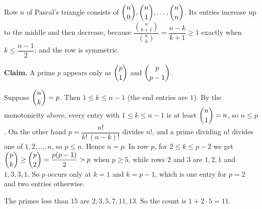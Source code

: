 Row $n$ of Pascal's triangle consists of $\dbinom n0,\dbinom n1,\dots,\dbinom nn$. Its entries increase up to the middle and then decrease, because $\dfrac{\binom n{k+1}}{\binom nk}=\dfrac{n-k}{k+1}\ge1$ exactly when $k\le\dfrac{n-1}{2}$; and the row is symmetric.

\textbf{Claim.} A prime $p$ appears only as $\dbinom p1$ and $\dbinom p{p-1}$.

Suppose $\dbinom nk=p$. Then $1\le k\le n-1$ (the end entries are $1$). By the monotonicity above, every entry with $1\le k\le n-1$ is at least $\dbinom n1=n$, so $n\le p$. On the other hand $p=\dfrac{n!}{k!\,(n-k)!}$ divides $n!$, and a prime dividing $n!$ divides one of $1,2,\dots,n$, so $p\le n$. Hence $n=p$. In row $p$, for $2\le k\le p-2$ we get $\dbinom pk\ge\dbinom p2=\dfrac{p(p-1)}{2}>p$ when $p\ge5$, while rows $2$ and $3$ are $1,2,1$ and $1,3,3,1$. So $p$ occurs only at $k=1$ and $k=p-1$, which is one entry for $p=2$ and two entries otherwise.

The primes less than $15$ are $2,3,5,7,11,13$. So the count is $1+2\cdot5=\boxed{11}$.
